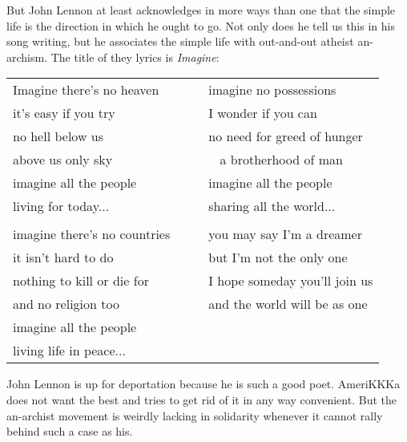 But John Lennon at least acknowledges in more ways than one that the simple life is the direction in which he ought to go. Not only does he tell us this in his song writing, but he associates the simple life with out-and-out atheist an-archism. The title of they lyrics is \emph{Imagine}: 
\begin{center}
\begin{tabular}{l l l l}
Imagine there's no heaven & & &  imagine no possessions\\
it's easy if you try & & & I wonder if you can\\
no hell below us & & &  no need for greed of hunger\\
above us only sky & & &  $\;\;$ a brotherhood of man\\
imagine all the people & & &  imagine all the people\\
living for today... & & & sharing all the world...\\
\\
imagine there's no countries & & & you may say I'm a dreamer\\
it isn't hard to do & & & but I'm not the only one\\
nothing to kill or die for & & & I hope someday you'll join us\\
and no religion too & & & and the world will be as one\\
imagine all the people\\
living life in peace...
\end{tabular}
\end{center}
John Lennon is up for deportation because he is such a good poet. AmeriKKKa does not want the best and tries to get rid of it in any way convenient. But the an-archist movement is weirdly lacking in solidarity whenever it cannot rally behind such a case as his.

